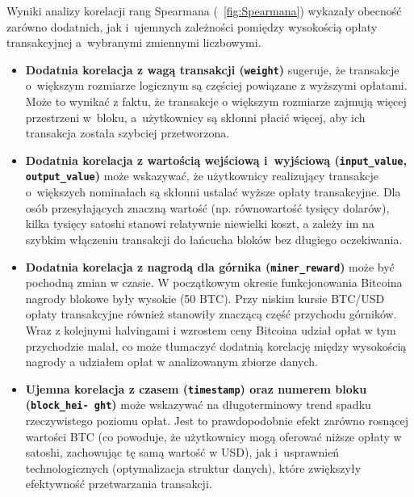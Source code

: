 \documentclass[12pt,a4paper]{report}
\theoremstyle{definition} %
\begin{document}
Wyniki analizy korelacji rang Spearmana (\figurename~\ref{fig:Spearmana}) wykazały obecność zarówno dodatnich, jak i~ujemnych zależności pomiędzy wysokością opłaty transakcyjnej a~wybranymi zmiennymi liczbowymi. 
\begin{itemize}
    \item \textbf{Dodatnia korelacja z wagą transakcji (\texttt{weight})} sugeruje, że transakcje o~większym rozmiarze logicznym są częściej powiązane z wyższymi opłatami. Może to wynikać z faktu, że transakcje o większym rozmiarze zajmują więcej przestrzeni w~bloku, a~użytkownicy są skłonni płacić więcej, aby ich transakcja została szybciej przetworzona.
    \item \textbf{Dodatnia korelacja z wartością wejściową i~wyjściową (\texttt{input\_value}, \texttt{output\_value})} może wskazywać, że użytkownicy realizujący transakcje o~większych nominałach są skłonni ustalać wyższe opłaty transakcyjne. Dla osób przesyłających znaczną wartość (np. równowartość tysięcy dolarów), kilka tysięcy satoshi stanowi relatywnie niewielki koszt, a zależy im na szybkim włączeniu transakcji do łańcucha bloków bez długiego oczekiwania.
    \item \textbf{Dodatnia korelacja z nagrodą dla górnika (\texttt{miner\_reward})} może być pochodną zmian w czasie. W początkowym okresie funkcjonowania Bitcoina nagrody blokowe były wysokie (50 BTC). Przy niskim kursie BTC/USD opłaty transakcyjne również stanowiły znaczącą część przychodu górników. Wraz z kolejnymi halvingami i wzrostem ceny Bitcoina udział opłat w tym przychodzie malał, co może tłumaczyć dodatnią korelację między wysokością nagrody a udziałem opłat w analizowanym zbiorze danych.
    \item \textbf{Ujemna korelacja z czasem (\texttt{timestamp}) oraz numerem bloku (\texttt{block\_hei- ght})} może wskazywać na długoterminowy trend spadku rzeczywistego poziomu opłat. Jest to prawdopodobnie efekt zarówno rosnącej wartości BTC (co powoduje, że użytkownicy mogą oferować niższe opłaty w satoshi, zachowując tę samą wartość w USD), jak i~usprawnień technologicznych (optymalizacja struktur danych), które zwiększyły efektywność przetwarzania transakcji.
\end{itemize}
\end{document}
